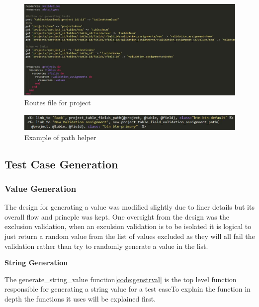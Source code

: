 \documentclass[a4paper,12pt]{article}
\begin{document}
\begin{figure}
\includegraphics[width=\linewidth]{screenshots/routes}
\caption{Routes file for project}
\label{fig:routes}
\end{figure}

\begin{figure}
\includegraphics[width=\linewidth]{screenshots/root}
\caption{Example of path helper}
\label{fig:pathhelp}
\end{figure}

\subsection{Test Case Generation}


\subsubsection{Value Generation}

\par The design for generating a value was modified slightly due to finer details but its overall flow and princple was kept. One oversight from the design was the exclusion validation, when an exculsion validation is to be isolated it is logical to just return a random value from the list of values excluded as they will all fail the validation rather than try to randomly generate a value in the list.

\par \textbf{String Generation}

\par The generate\_string\_value function\ref{code:genstrval} is the top level function responsible for generating a string value for a test caseTo explain the function in depth the functions it uses will be explained first.
\end{document}
